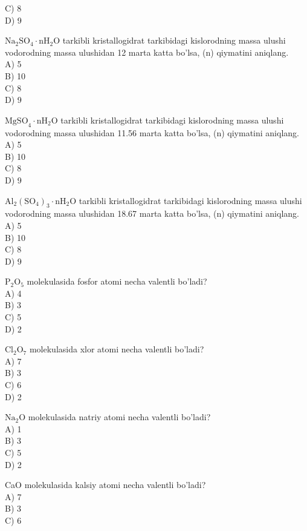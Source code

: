 C) 8\\
D) 9
  \item $\mathrm{Na}_{2} \mathrm{SO}_{4} \cdot \mathrm{nH}_{2} \mathrm{O}$ tarkibli kristallogidrat tarkibidagi kislorodning massa ulushi vodorodning massa ulushidan 12 marta katta bo'lsa, (n) qiymatini aniqlang.\\
A) 5\\
B) 10\\
C) 8\\
D) 9
  \item $\mathrm{MgSO}_{4} \cdot \mathrm{nH}_{2} \mathrm{O}$ tarkibli kristallogidrat tarkibidagi kislorodning massa ulushi vodorodning massa ulushidan 11.56 marta katta bo'lsa, (n) qiymatini aniqlang.\\
A) 5\\
B) 10\\
C) 8\\
D) 9
  \item $\mathrm{Al}_{2}\left(\mathrm{SO}_{4}\right)_{3} \cdot \mathrm{nH}_{2} \mathrm{O}$ tarkibli kristallogidrat tarkibidagi kislorodning massa ulushi vodorodning massa ulushidan 18.67 marta katta bo'lsa, (n) qiymatini aniqlang.\\
A) 5\\
B) 10\\
C) 8\\
D) 9
  \item $\mathrm{P}_{2} \mathrm{O}_{5}$ molekulasida fosfor atomi necha valentli bo'ladi?\\
A) 4\\
B) 3\\
C) 5\\
D) 2
  \item $\mathrm{Cl}_{2} \mathrm{O}_{7}$ molekulasida xlor atomi necha valentli bo'ladi?\\
A) 7\\
B) 3\\
C) 6\\
D) 2
  \item $\mathrm{Na}_{2} \mathrm{O}$ molekulasida natriy atomi necha valentli bo'ladi?\\
A) 1\\
B) 3\\
C) 5\\
D) 2
  \item CaO molekulasida kalsiy atomi necha valentli bo'ladi?\\
A) 7\\
B) 3\\
C) 6\\
